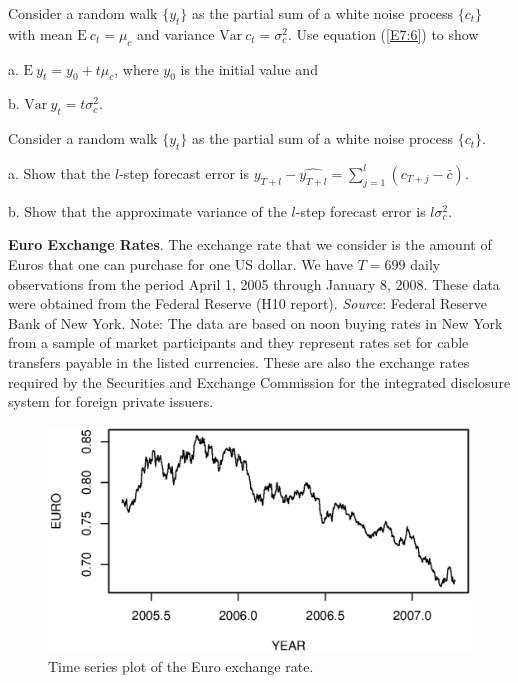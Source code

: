 \begin{exercises}

\item Consider a random walk $\{y_t \}$ as the partial sum of a white noise process $\{ c_t \}$ with
mean $\mathrm{E}~c_t= \mu_c$ and variance $\mathrm{Var}~c_t =
\sigma_c^2$. Use equation (\ref{E7:6}) to show

a.  $\mathrm{E}~y_t= y_0 + t \mu_c$, where $y_0$ is the initial
value and

b.  $\mathrm{Var}~y_t= t \sigma_c^2$.

\item Consider a random walk $\{y_t \}$ as the partial sum of a white noise process $\{ c_t
\}$.

a. Show that the $l$-step forecast error is
$y_{T+l}-\widehat{y_{T+l}} = \sum_{j=1}^l (c_{T+j} - \bar{c} ).$

b. Show that the approximate variance of the $l$-step forecast error
is $l \sigma_c^2.$




\item \textbf{Euro Exchange Rates}. The exchange rate that we consider is the amount of Euros that one
can purchase for one US dollar. We have $T=699$ daily observations
from the period April 1, 2005 through January 8, 2008. These data
were obtained from the Federal Reserve (H10 report). \emph{Source}:
Federal Reserve Bank of New York. Note: The data are based on noon
buying rates in New York from a sample of market participants and
they represent rates set for cable transfers payable in the listed
currencies. These are also the exchange rates required by the
Securities and Exchange Commission for the integrated disclosure
system for foreign private issuers.


\begin{figure}[htp]
  \begin{center}
   \includegraphics[width=1\textwidth,angle=0,scale=0.6]{Chapter7Trend/EuroPlot1.eps}
   \caption{\label{Ex:EuroPlot1} \small Time series plot of the Euro exchange rate.}
  \end{center}
\end{figure}



\end{exercises}
